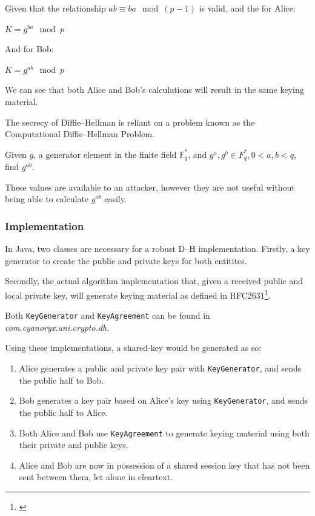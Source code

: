   Given that the relationship $ab \equiv ba \mod (p-1)$ is valid, and the for Alice:
  
  \begin{center}
    $K = g^{ba} \mod p$
  \end{center}
  
  And for Bob:
  
  \begin{center}
    $K = g^{ab} \mod p$
  \end{center}
  
  We can see that both Alice and Bob's calculations will result in the same keying material.
  
  The secrecy of Diffie--Hellman is reliant on a problem known as the Computational Diffie--Hellman Problem. 
  
  \begin{mathdef}
    Given $g$, a generator element in the finite field $\mathbb{F}_q^*$, and ${g^a,g^b} \in F_q^*, 0 < a, b < q$, find $g^{ab}$.
  \end{mathdef}
  
  These values are available to an attacker, however they are not useful without being able to calculate $g^{ab}$ easily.
  
    \subsubsection{Implementation}
    
    In Java, two classes are necessary for a robust D--H implementation. Firstly, a key generator to create the public and private keys for both entitites.
    
     
    
    Secondly, the actual algorithm implementation that, given a received public and local private key, will generate keying material as defined in RFC2631\footnote{\cite{Rescorla:1999aa}}.
    
    
    
    Both \verb!KeyGenerator! and \verb!KeyAgreement! can be found in \emph{com.cyanoryx.uni.crypto.dh}.
    
    Using these implementations, a shared-key would be generated as so:
    
    \begin{enumerate}
      \item Alice generates a public and private key pair with \verb!KeyGenerator!, and sends the public half to Bob.
      \item Bob generates a key pair based on Alice's key using \verb!KeyGenerator!, and sends the public half to Alice.
      \item Both Alice and Bob use \verb!KeyAgreement! to generate keying material using both their private and public keys.
      \item Alice and Bob are now in possession of a shared session key that has not been sent between them, let alone in cleartext.
    \end{enumerate}
  
